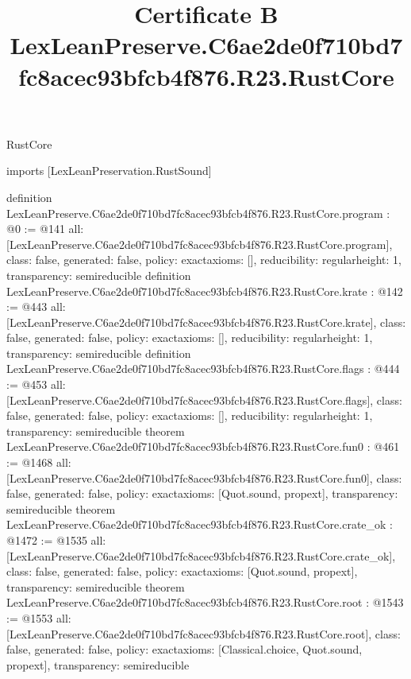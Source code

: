 \begin{lexlean}{RustCore}
\title{Certificate B LexLeanPreserve.C6ae2de0f710bd7fc8acec93bfcb4f876.R23.RustCore}
\begin{coremodule}
imports [LexLeanPreservation.RustSound]

definition LexLeanPreserve.C6ae2de0f710bd7fc8acec93bfcb4f876.R23.RustCore.program : @0 := @141 {
  all: [LexLeanPreserve.C6ae2de0f710bd7fc8acec93bfcb4f876.R23.RustCore.program],
  class: false,
  generated: false,
  policy: exact{axioms: []},
  reducibility: regular{height: 1},
  transparency: semireducible
}
definition LexLeanPreserve.C6ae2de0f710bd7fc8acec93bfcb4f876.R23.RustCore.krate : @142 := @443 {
  all: [LexLeanPreserve.C6ae2de0f710bd7fc8acec93bfcb4f876.R23.RustCore.krate],
  class: false,
  generated: false,
  policy: exact{axioms: []},
  reducibility: regular{height: 1},
  transparency: semireducible
}
definition LexLeanPreserve.C6ae2de0f710bd7fc8acec93bfcb4f876.R23.RustCore.flags : @444 := @453 {
  all: [LexLeanPreserve.C6ae2de0f710bd7fc8acec93bfcb4f876.R23.RustCore.flags],
  class: false,
  generated: false,
  policy: exact{axioms: []},
  reducibility: regular{height: 1},
  transparency: semireducible
}
theorem LexLeanPreserve.C6ae2de0f710bd7fc8acec93bfcb4f876.R23.RustCore.fun0 : @461 := @1468 {
  all: [LexLeanPreserve.C6ae2de0f710bd7fc8acec93bfcb4f876.R23.RustCore.fun0],
  class: false,
  generated: false,
  policy: exact{axioms: [Quot.sound, propext]},
  transparency: semireducible
}
theorem LexLeanPreserve.C6ae2de0f710bd7fc8acec93bfcb4f876.R23.RustCore.crate_ok : @1472 := @1535 {
  all: [LexLeanPreserve.C6ae2de0f710bd7fc8acec93bfcb4f876.R23.RustCore.crate_ok],
  class: false,
  generated: false,
  policy: exact{axioms: [Quot.sound, propext]},
  transparency: semireducible
}
theorem LexLeanPreserve.C6ae2de0f710bd7fc8acec93bfcb4f876.R23.RustCore.root : @1543 := @1553 {
  all: [LexLeanPreserve.C6ae2de0f710bd7fc8acec93bfcb4f876.R23.RustCore.root],
  class: false,
  generated: false,
  policy: exact{axioms: [Classical.choice, Quot.sound, propext]},
  transparency: semireducible
}


\end{coremodule}
\end{lexlean}
